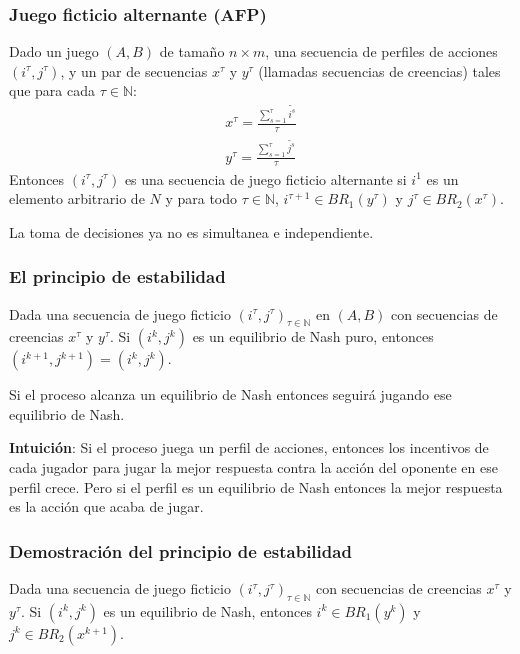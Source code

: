 \documentclass[handout, pdf]{beamer}
\newcommand{\pstrat}{\widetilde}
\begin{document}
\begin{frame}
    \frametitle{Juego ficticio alternante (AFP)}
    \begin{definition} 
        Dado un juego $(A, B)$  de tamaño $n \times m$, una secuencia de perfiles de acciones $(i^\tau, j^\tau)$, y un par de secuencias $x^\tau$ y $y^\tau$ (llamadas secuencias de creencias) tales que para cada $\tau \in \mathbb{N}$:
        \begin{gather*}
            x^\tau= \frac{\sum^\tau_{s=1} \pstrat{i^s}}{\tau}  \\
            y^\tau= \frac{\sum^\tau_{s=1} \pstrat{j^s}}{\tau}
        \end{gather*}
        Entonces $(i^\tau, j^\tau)$ es una secuencia de juego ficticio alternante si $i^1$ es un elemento arbitrario de $N$ y para todo $\tau \in \mathbb{N}$, $i^{\tau+1} \in BR_1(y^\tau)$ y $j^{\tau} \in BR_2(x^\tau)$.
    \end{definition}
    \pause La toma de decisiones ya no es simultanea e independiente.

\end{frame}

\begin{frame}
    \frametitle{El principio de estabilidad}
    \begin{theorem}
        Dada una secuencia de juego ficticio $(i^\tau, j^\tau)_{\tau \in \mathbb{N}}$ en $(A, B)$ con secuencias de creencias $x^\tau$ y $y^\tau$. Si $(i^k, j^k)$ es un equilibrio de Nash puro, entonces $(i^{k+1}, j^{k+1}) = (i^k, j^k)$.
    \end{theorem}
    \pause Si el proceso alcanza un equilibrio de Nash entonces seguirá jugando ese equilibrio de Nash.

    \pause \textbf{Intuición}: Si el proceso juega un perfil de acciones, entonces los incentivos de cada jugador para jugar la mejor respuesta contra la acción del oponente en ese perfil crece. Pero si el perfil es un equilibrio de Nash entonces la mejor respuesta es la acción que acaba de jugar.
\end{frame}

\begin{frame}
    \frametitle{Demostración del principio de estabilidad}
    \begin{lemma}[1]
        Dada una secuencia de juego ficticio $(i^\tau, j^\tau)_{\tau \in \mathbb{N}}$ con secuencias de creencias $x^\tau$ y $y^\tau$. Si $(i^k, j^k)$ es un equilibrio de Nash, entonces $i^k \in BR_1(y^{k})$ y $j^k \in BR_2(x^{k+1})$.
    \end{lemma}
\end{frame}
\end{document}
